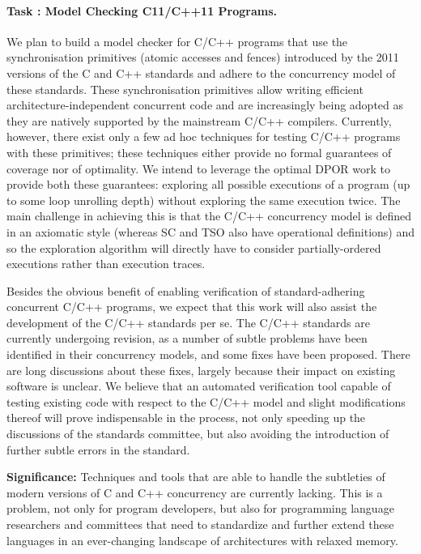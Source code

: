 \documentclass[11pt]{article}
\newcounter{Task}
\newcommand{\task}[1]{\addtocounter{Task}{1}\paragraph{Task \theTask: #1}}
\newcommand{\significance}[1]{\vspace*{-0.5em}%
  \begin{quoting}\noindent\textbf{Significance:} #1\end{quoting}}
\newcommand{\myparagraph}{}
\let\myparagraph=\paragraph
\renewcommand{\paragraph}{\vspace{-3mm}\myparagraph}
\begin{document}
{\task{Model Checking C11/C++11 Programs.} \label{task:rcmc}
We plan to build a model checker for C/C++ programs that use the
synchronisation primitives (atomic accesses and fences) introduced by the
2011 versions of the C and C++ standards and adhere to the concurrency
model of these standards. These synchronisation primitives allow writing
efficient architecture-independent concurrent code and are increasingly
being adopted as they are natively supported by the mainstream C/C++
compilers. Currently, however, there exist only a few ad hoc techniques for
testing C/C++ programs with these primitives; these techniques either
provide no formal guarantees of coverage nor of optimality. We intend to
leverage the optimal DPOR work to provide both these guarantees: exploring
all possible executions of a program (up to some loop unrolling depth)
without exploring the same execution twice. The main challenge in achieving
this is that the C/C++ concurrency model is defined in an axiomatic style
(whereas SC and TSO also have operational definitions) and so the
exploration algorithm will directly have to consider partially-ordered
executions rather than execution traces.

Besides the obvious benefit of enabling verification of standard-adhering
concurrent C/C++ programs, we expect that this work will also assist the
development of the C/C++ standards per se. The C/C++ standards are
currently undergoing revision, as a number of subtle problems have been
identified in their concurrency models, and some fixes have been
proposed. There are long discussions about these fixes, largely because
their impact on existing software is unclear. We believe that an automated
verification tool capable of testing existing code with respect to the
C/C++ model and slight modifications thereof will prove indispensable in
the process, not only speeding up the discussions of the standards
committee, but also avoiding the introduction of further subtle errors in
the standard.

\significance{Techniques and tools that are able to handle the subtleties
  of modern versions of C and C++ concurrency are currently lacking. This
  is a problem, not only for program developers, but also for programming
  language researchers and committees that need to standardize and further
  extend these languages in an ever-changing landscape of architectures
  with relaxed memory.}
}
\end{document}
